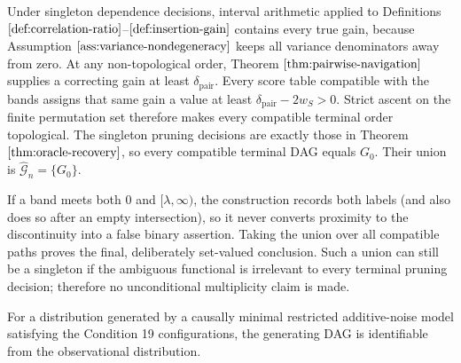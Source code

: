 Under singleton dependence decisions, interval arithmetic applied to Definitions \(\ref{def:correlation-ratio}\)--\(\ref{def:insertion-gain}\) contains every true gain, because Assumption \(\ref{ass:variance-nondegeneracy}\) keeps all variance denominators away from zero.  At any non-topological order, Theorem \(\ref{thm:pairwise-navigation}\) supplies a correcting gain at least \(\delta_{\mathrm{pair}}\).  Every score table compatible with the bands assigns that same gain a value at least \(\delta_{\mathrm{pair}}-2w_S>0\).  Strict ascent on the finite permutation set therefore makes every compatible terminal order topological.  The singleton pruning decisions are exactly those in Theorem \(\ref{thm:oracle-recovery}\), so every compatible terminal DAG equals \(G_0\).  Their union is \(\widehat{\mathcal G}_n=\{G_0\}\).

If a band meets both \(0\) and \([\lambda,\infty)\), the construction records both labels (and also does so after an empty intersection), so it never converts proximity to the discontinuity into a false binary assertion.  Taking the union over all compatible paths proves the final, deliberately set-valued conclusion.  Such a union can still be a singleton if the ambiguous functional is irrelevant to every terminal pruning decision; therefore no unconditional multiplicity claim is made.

For a distribution generated by a causally minimal restricted additive-noise model satisfying the Condition 19 configurations, the generating DAG is identifiable from the observational distribution.
